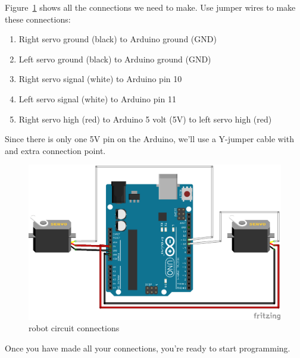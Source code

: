 \documentclass[letterpaper]{article}
\begin{document}
Figure~\ref{fig:circuit} shows all the connections we need to make.
Use jumper wires to make these connections:
\begin{enumerate}
    \item Right servo ground (black) to Arduino ground (GND)
    \item Left servo ground (black) to Arduino ground (GND)
    \item Right servo signal (white) to Arduino pin 10
    \item Left servo signal (white) to Arduino pin 11
    \item Right servo high (red) to Arduino 5 volt (5V) to left servo high (red)
\end{enumerate}
Since there is only one 5V pin on the Arduino,
we'll use a Y-jumper cable with and extra connection point.

\begin{figure}[h!]
    \centering
    \includegraphics[width=\textwidth]{wiring.png}
    \caption{robot circuit connections}
    \label{fig:circuit}
\end{figure}

Once you have made all your connections, you're ready to start programming.


\clearpage


\end{document}

